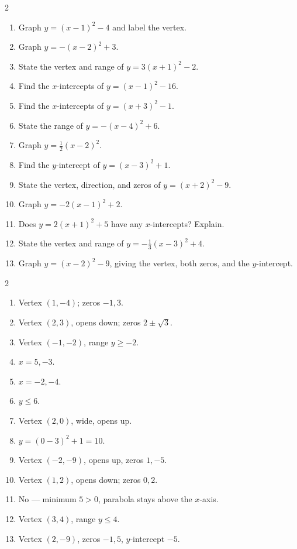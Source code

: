 \documentclass[11pt]{article}
\begin{document}
\begin{recapbox}
\begin{multicols}{2}
\small
\begin{enumerate}[leftmargin=*,itemsep=3pt]
  \item Graph $y=(x-1)^2-4$ and label the vertex.
  \item Graph $y=-(x-2)^2+3$.
  \item State the vertex and range of $y=3(x+1)^2-2$.
  \item Find the $x$-intercepts of $y=(x-1)^2-16$.
  \item Find the $x$-intercepts of $y=(x+3)^2-1$.
  \item State the range of $y=-(x-4)^2+6$.
  \item Graph $y=\tfrac12(x-2)^2$.
  \item Find the $y$-intercept of $y=(x-3)^2+1$.
  \item State the vertex, direction, and zeros of $y=(x+2)^2-9$.
  \item Graph $y=-2(x-1)^2+2$.
  \item Does $y=2(x+1)^2+5$ have any $x$-intercepts? Explain.
  \item State the vertex and range of $y=-\tfrac13(x-3)^2+4$.
  \item Graph $y=(x-2)^2-9$, giving the vertex, both zeros, and the $y$-intercept.
\end{enumerate}
\end{multicols}
\end{recapbox}

\begin{keybox}
\begin{multicols}{2}
\small
\begin{enumerate}[leftmargin=*,itemsep=3pt]
  \item Vertex $(1,-4)$; zeros $-1,3$.
  \item Vertex $(2,3)$, opens down; zeros $2\pm\sqrt3$.
  \item Vertex $(-1,-2)$, range $y\ge-2$.
  \item $x=5,-3$.
  \item $x=-2,-4$.
  \item $y\le6$.
  \item Vertex $(2,0)$, wide, opens up.
  \item $y=(0-3)^2+1=10$.
  \item Vertex $(-2,-9)$, opens up, zeros $1,-5$.
  \item Vertex $(1,2)$, opens down; zeros $0,2$.
  \item No --- minimum $5>0$, parabola stays above the $x$-axis.
  \item Vertex $(3,4)$, range $y\le4$.
  \item Vertex $(2,-9)$, zeros $-1,5$, $y$-intercept $-5$.
\end{enumerate}
\end{multicols}
\end{keybox}
\end{document}
